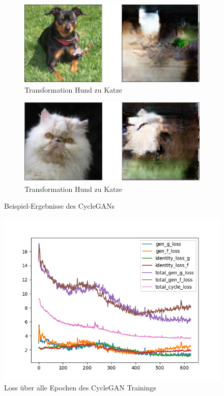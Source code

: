  
 \begin{figure}[ht]
 	\centering
 	\begin{subfigure}{\textwidth}
 		\centering
 		\includegraphics[width=.8\linewidth]{images/dogToCat}  
 		\caption{Transformation Hund zu Katze}
 		\label{fig:sub-dogtocat}
 	\end{subfigure}
 	\newline
 	\begin{subfigure}{\textwidth}
 		\centering
 		\includegraphics[width=.8\linewidth]{images/catToDog}  
 		\caption{Transformation Hund zu Katze}
 		\label{fig:sub-cattodog}
 	\end{subfigure}
 	\caption{Beispiel-Ergebnisse des CycleGANs}
 \end{figure}
 
 \begin{figure}
 	\centering
 	\includegraphics[width=0.7\linewidth]{images/plot_line_plot_loss}
 	\caption{\centering Loss über alle Epochen des CycleGAN Trainings}
 	\label{fig:cycleganloss}
 \end{figure}
 
